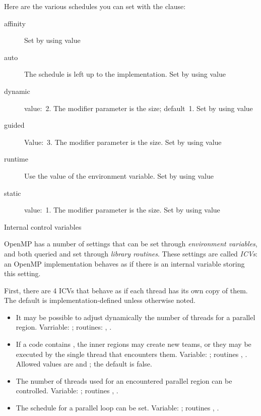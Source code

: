Here are the various schedules you can set with the
 clause:
\begin{description}
  \item[affinity] Set by using value  
  \item[auto] The schedule is left up to the implementation. Set by
    using value 
  \item[dynamic] value:~2. The modifier parameter is the
     size; default~1. Set by using value
  \item[guided] Value:~3. The modifier parameter is the
     size. Set by using value
  \item[runtime] Use the value of the 
    environment variable. Set by using value
  \item[static] value:~1. The modifier parameter is the  size. Set by using value  
\end{description}

 {Internal control variables}
\label{ref:omp-environ}

OpenMP has a number of settings that can be set through \emph{environment variables},
and both queried and set through \emph{library routines}. These settings are called
\emph{\acfp{ICV}}: an OpenMP implementation behaves as if there is an internal variable
storing this setting.

First, there are 4 \acp{ICV} that behave as if each thread has its own copy of them.
The default is implementation-defined unless otherwise noted.
\begin{itemize}
  \item It may be possible to adjust dynamically the number of threads
    for a parallel region. Varriable: ;
    routines: ,
    .
  \item If a code contains ,
    the inner regions may create new teams, or they may be executed by
    the single thread that encounters them. Variable:
    ; routines ,
    . Allowed values are  and
    ; the default is false.
  \item The number of threads used for an encountered parallel region
    can be controlled. Variable: ;
    routines ,
    .
    \item The schedule for a parallel loop can be set. Variable:
      ; routines
      , .
\end{itemize}

